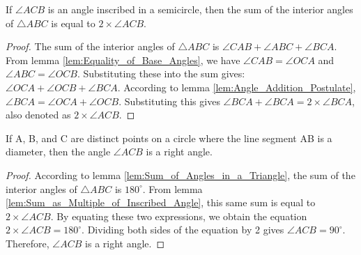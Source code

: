 \begin{lemma}
    \label{lem:Sum_as_Multiple_of_Inscribed_Angle}
    If $\angle ACB$ is an angle inscribed in a semicircle, then the sum of the interior angles of $\triangle ABC$ is equal to $2 \times \angle ACB$.
\end{lemma}

\begin{proof}
    The sum of the interior angles of $\triangle ABC$ is $\angle CAB + \angle ABC + \angle BCA$.
    From lemma \ref{lem:Equality_of_Base_Angles}, we have $\angle CAB = \angle OCA$ and $\angle ABC = \angle OCB$.
    Substituting these into the sum gives: $\angle OCA + \angle OCB + \angle BCA$.
    According to lemma \ref{lem:Angle_Addition_Postulate}, $\angle BCA = \angle OCA + \angle OCB$.
    Substituting this gives $\angle BCA + \angle BCA = 2 \times \angle BCA$, also denoted as $2 \times \angle ACB$.
\end{proof}

\begin{theorem}
    \label{thm:Thales_Theorem}
    If A, B, and C are distinct points on a circle where the line segment AB is a diameter, then the angle $\angle ACB$ is a right angle.
\end{theorem}

\begin{proof}
    According to lemma \ref{lem:Sum_of_Angles_in_a_Triangle}, the sum of the interior angles of $\triangle ABC$ is $180^\circ$.
    From lemma \ref{lem:Sum_as_Multiple_of_Inscribed_Angle}, this same sum is equal to $2 \times \angle ACB$.
    By equating these two expressions, we obtain the equation $2 \times \angle ACB = 180^\circ$.
    Dividing both sides of the equation by 2 gives $\angle ACB = 90^\circ$.
    Therefore, $\angle ACB$ is a right angle.
\end{proof}